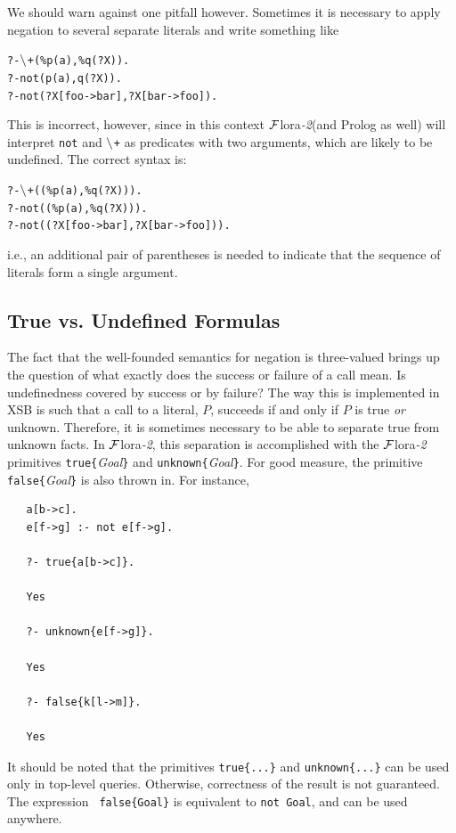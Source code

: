 \documentclass[11pt]{article}
\newcommand{\FLORA}{{\mbox{\sc ${\cal F}${lora}\rm\emph{-2}}}\xspace}
\newcommand{\NAF}{\mbox{\tt \ensuremath{\tt\backslash}+}\xspace}
\newcommand{\TNOT}{{{\tt not}}\xspace}
\begin{document}
We should warn against one pitfall however. Sometimes it is necessary to
apply negation to several separate literals and write something like
\begin{alltt}
       ?- \NAF(\%p(a),\%q(?X)).
       ?- \TNOT(p(a),q(?X)).
       ?- \TNOT(?X[foo->bar], ?X[bar->foo]).
\end{alltt}
This is incorrect, however, since in this context \FLORA (and Prolog as
well) will interpret \TNOT and \NAF as predicates with two arguments,
which are likely to be undefined. The correct syntax is:
\begin{alltt}
       ?- \NAF((\%p(a),\%q(?X))).
       ?- \TNOT((\%p(a),\%q(?X))).
       ?- \TNOT((?X[foo->bar], ?X[bar->foo])).
\end{alltt}
i.e., an additional pair of parentheses is needed to indicate that
the sequence of literals form a single argument.

\subsection{True vs. Undefined Formulas}

The fact that the well-founded semantics for negation is three-valued
brings up the question of what exactly does the success or failure of a
call mean. Is undefinedness covered by success or by failure?  The way
this is implemented in XSB is such that a call to a literal, $P$, succeeds
if and only if $P$ is true \emph{or} unknown.  Therefore, it is sometimes
necessary to be able to separate true from unknown facts. In \FLORA, this
separation is accomplished with the \FLORA primitives
{\tt true\{}\emph{Goal}{\tt \}} and {\tt unknown\{}\emph{Goal}{\tt \}}.
For good measure, the primitive {\tt false\{}\emph{Goal}{\tt \}} is also
thrown in. For instance,
\begin{verbatim}
   a[b->c].
   e[f->g] :- not e[f->g].

   ?- true{a[b->c]}.

   Yes

   ?- unknown{e[f->g]}.

   Yes

   ?- false{k[l->m]}.

   Yes
\end{verbatim}
It should be noted that the primitives {\tt true\{...\}}  and
{\tt unknown\{...\}} can be used only in top-level queries. Otherwise,
correctness of the result is not guaranteed. The expression {\tt
  false\{Goal\}} is equivalent to {\tt not Goal},  and can be used
anywhere.
\end{document}
